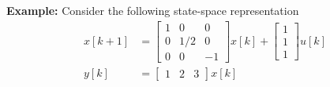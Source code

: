 \documentclass[twoside]{article}
\begin{document}
\newpage

\textbf{Example:} Consider the following state-space representation
%
\begin{align*}
  x[k+1] &= \left[ \begin{array}{ccc} 1 & 0 & 0\\ 0 & 1/2 & 0
    \\ 0 & 0 & -1 \end{array} \right] x[k] 
    + \left[ \begin{array}{c} 1 \\ 1 \\ 1\end{array} \right] u[k]
\\
 y[k] &= \left[ \begin{array}{ccc} 1 & 2 & 3 \end{array} \right] x[k] 
\end{align*}
%
\end{document}
